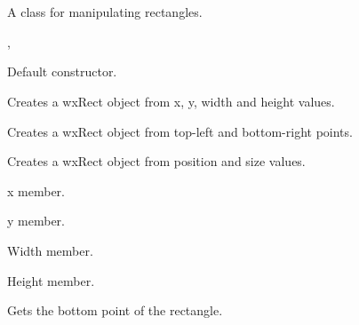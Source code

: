 \section{}\label{wxrect}

A class for manipulating rectangles.




, 




Default constructor.


Creates a wxRect object from x, y, width and height values.


Creates a wxRect object from top-left and bottom-right points.


Creates a wxRect object from position and size values.



x member.



y member.



Width member.



Height member.

\label{wxrectgetbottom}


Gets the bottom point of the rectangle.

\label{wxrectgetheight}

